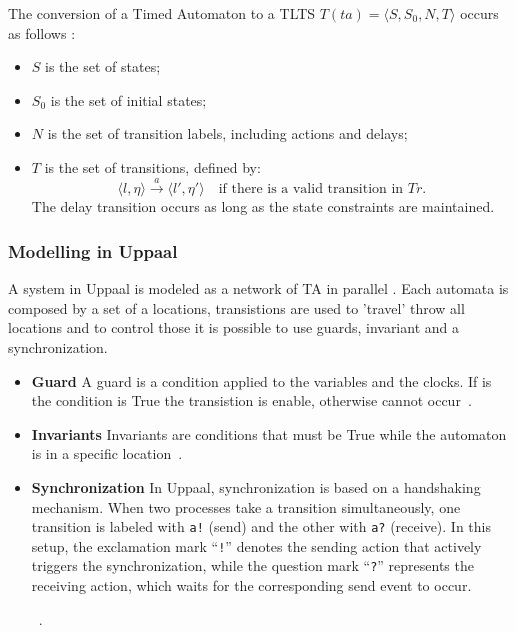 The conversion of a Timed Automaton to a TLTS \( T(ta) = \langle S, S_0, N, T \rangle \) occurs as follows \cite{baier2008principles}:

\begin{itemize}
    \item \( S \) is the set of states;
    \item \( S_0 \) is the set of initial states;
    \item \( N \) is the set of transition labels, including actions and delays;
    \item \( T \) is the set of transitions, defined by:
    \[
        \langle l, \eta \rangle \xrightarrow{a} \langle l', \eta' \rangle \quad \text{if there is a valid transition in } Tr.
    \]
    The delay transition occurs as long as the state constraints are maintained.
\end{itemize}




\subsubsection*{Modelling in Uppaal}

A system in Uppaal is modeled as a network of TA in parallel \cite{proenca-spreadsheet-2023}. Each automata is composed by a set of a locations, transistions are used to 'travel' throw all locations and to control those it is possible to use guards, invariant and a synchronization.

\begin{itemize}
    \item \textbf{Guard} A guard is a condition applied to the variables and the clocks. If is the condition is True the transistion is enable, otherwise cannot occur~\cite{Behrmann2006}.

    \item \textbf{Invariants} Invariants are conditions that must be True while the automaton is in a specific location~\cite{Behrmann2006}.

    \item \textbf{Synchronization}  In Uppaal, synchronization is based on a handshaking mechanism. When two processes take a transition simultaneously, one transition is labeled with \texttt{a!} (send) and the other with \texttt{a?} (receive). In this setup, the exclamation mark ``\texttt{!}'' denotes the sending action that actively triggers the synchronization, while the question mark ``\texttt{?}'' represents the receiving action, which waits for the corresponding send event to occur.

~\cite{Behrmann2006}.
\end{itemize}

